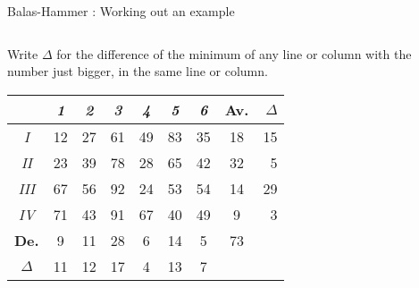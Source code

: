 \documentclass[32pt,aspectratio=169]{beamer}
\begin{document}
\begin{frame}{Balas-Hammer : Working out an example}
  \begin{columns}
    \begin{column}{.6\textwidth}
      Write $\Delta$ for the difference of the minimum of any line or
      column with the number just bigger, in the same line or column.
      
      \begin{overlayarea}{\textwidth}{.5\textheight}
        \vspace{.5cm}
        \small{
          \begin{tabular}{c|c|c|c|c|c|c|c|r}
            & \textit{1} & \textit{2} & \textit{3} & \textit{4} & \textit{5} & \textit{6} & \cellcolor{blue!50}\textbf{Av.} & \color{blue}$\Delta$\\
            \hline
            \textit{I} & \cellcolor{blue!25}12 & \cellcolor{blue!25}27 & \cellcolor{blue!25}61 & \cellcolor{blue!25}49 & \cellcolor{blue!25}83 & \cellcolor{blue!25}35 & \cellcolor{blue!50}18 & \color{blue}15 \\
            \hline 
            \textit{II} & \cellcolor{blue!25}23 & \cellcolor{blue!25}39 & \cellcolor{blue!25}78 & \cellcolor{blue!25}28 & \cellcolor{blue!25}65 & \cellcolor{blue!25}42 & \cellcolor{blue!50}32 & \color{blue}5 \\
            \hline
            \textit{III} & \cellcolor{blue!25}67 & \cellcolor{blue!25}56 & \cellcolor{blue!25}92 & \cellcolor{blue!25}24 & \cellcolor{blue!25}53 & \cellcolor{blue!25}54 & \cellcolor{blue!50}14 & \cellcolor{orange}\color{blue}29 \\
            \hline
            \textit{IV} & \cellcolor{blue!25}71 & \cellcolor{blue!25}43 & \cellcolor{blue!25}91 & \cellcolor{blue!25}67 & \cellcolor{blue!25}40 & \cellcolor{blue!25}49 & \cellcolor{blue!50}9 & \color{blue}3 \\
            \hline 
            \cellcolor{blue!50}\textbf{De.} & \cellcolor{blue!50}9 & \cellcolor{blue!50}11 & \cellcolor{blue!50}28 & \cellcolor{blue!50}6 & \cellcolor{blue!50}14 & \cellcolor{blue!50}5 & \cellcolor{blue!60}73 & \\            
            \cline{1-8}
            \color{blue}$\Delta$ & \color{blue}11 & \color{blue}12 & \color{blue}17 & \color{blue}4 & \color{blue}13 & \color{blue}7   
          \end{tabular}
        }
      \end{overlayarea}
    \end{column}
    \begin{column}{.4\textwidth}

\end{column}
\end{columns}
\end{frame}
\end{document}
